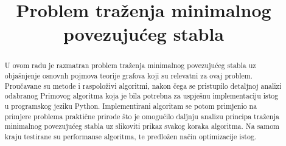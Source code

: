 \documentclass[conference]{IEEEtran}
\begin{document}
\long{}

\title{Problem traženja minimalnog povezujućeg stabla\\
}

\author{
\and
{}

}

\maketitle

\begin{abstract}
U ovom radu je razmatran problem traženja minimalnog povezujućeg stabla uz objašnjenje osnovnh pojmova teorije grafova koji su relevatni za ovaj problem. Proučavane su metode i raspoloživi algoritmi, nakon čega se pristupilo detaljnoj analizi odabranog Primovog algoritma koja je bila potrebna za uspješnu implementaciju istog u programskog jeziku Python. Implementirani algoritam se potom primjenio na primjere problema praktične prirode što je omogućilo daljnju analizu principa traženja minimalnog povezujućeg stabla uz slikoviti prikaz svakog koraka algoritma. Na samom kraju testirane su performanse algoritma, te predložen način optimizacije istog.
\end{abstract}
\end{document}
